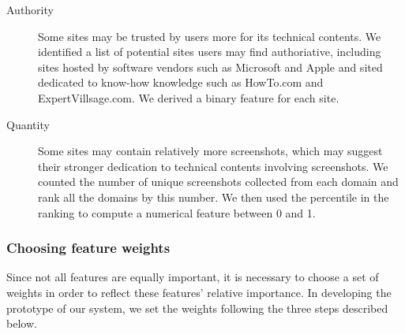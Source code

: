 \documentclass{www2010-submission}
\begin{document}
\begin{description}

\item[Authority] Some sites may be trusted by users more for its
  technical contents. We identified a list of potential sites users
  may find authoriative, including sites hosted by software vendors
  such as Microsoft and Apple and sited dedicated to know-how
  knowledge such as HowTo.com and ExpertVillsage.com. We derived a
  binary feature for each site.

\item[Quantity] Some sites may contain relatively more screenshots,
  which may suggest their stronger dedication to technical contents
  involving screenshots.  We counted the number of unique screenshots
  collected from each domain and rank all the domains by this
  number. We then used the percentile in the ranking to compute a
  numerical feature between 0 and 1.



\end{description}

\subsubsection{Choosing feature weights}

Since not all features are equally important, it is necessary to
choose a set of weights in order to reflect these features' relative
importance. In developing the prototype of our system, we set the
weights following the three steps described below.
\end{document}
